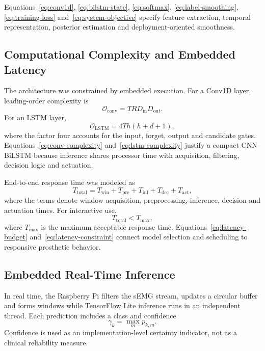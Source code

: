 \documentclass[technologies,article,submit,pdftex,moreauthors]{Definitions/mdpi}
\begin{document}
Equations~\eqref{eq:conv1d}, \eqref{eq:bilstm-state}, \eqref{eq:softmax}, \eqref{eq:label-smoothing}, \eqref{eq:training-loss} and~\eqref{eq:system-objective} specify feature extraction, temporal representation, posterior estimation and deployment-oriented smoothness.

\subsection{Computational Complexity and Embedded Latency}

The architecture was constrained by embedded execution. For a Conv1D layer, leading-order complexity is
\begin{equation}
    \label{eq:conv-complexity}
    \mathcal{O}_{\mathrm{conv}}
    =
    T R D_{\mathrm{in}}D_{\mathrm{out}}.
\end{equation}
For an LSTM layer,
\begin{equation}
    \label{eq:lstm-complexity}
    \mathcal{O}_{\mathrm{LSTM}}
    =
    4T h(h+d+1),
\end{equation}
where the factor four accounts for the input, forget, output and candidate gates. Equations~\eqref{eq:conv-complexity} and~\eqref{eq:lstm-complexity} justify a compact CNN--BiLSTM because inference shares processor time with acquisition, filtering, decision logic and actuation.

End-to-end response time was modeled as
\begin{equation}
    \label{eq:latency-budget}
    T_{\mathrm{total}}
    =
    T_{\mathrm{win}}
    +
    T_{\mathrm{pre}}
    +
    T_{\mathrm{inf}}
    +
    T_{\mathrm{dec}}
    +
    T_{\mathrm{act}},
\end{equation}
where the terms denote window acquisition, preprocessing, inference, decision and actuation times. For interactive use,
\begin{equation}
    \label{eq:latency-constraint}
    T_{\mathrm{total}} < T_{\max},
\end{equation}
where $T_{\max}$ is the maximum acceptable response time. Equations~\eqref{eq:latency-budget} and~\eqref{eq:latency-constraint} connect model selection and scheduling to responsive prosthetic behavior.

\subsection{Embedded Real-Time Inference}

In real time, the Raspberry Pi filters the sEMG stream, updates a circular buffer and forms windows while TensorFlow Lite inference runs in an independent thread. Each prediction includes a class and confidence
\begin{equation}
    \label{eq:confidence}
    \gamma_k = \max_m p_{k,m}.
\end{equation}
Confidence is used as an implementation-level certainty indicator, not as a clinical reliability measure.
\end{document}
